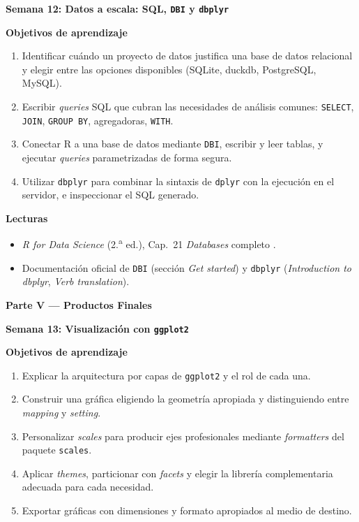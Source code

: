 \documentclass[11pt,letterpaper]{article}
\newcommand{\parteCurso}[1]{%
  \clearpage%
  \vspace*{0.5cm}%
  {\centering\color{main}\fontsize{26pt}{32pt}\selectfont\bfseries #1\par}%
  \vspace{0.8cm}%
}
\newcommand{\semana}[2]{%
  \bigskip%
  {\color{main}\Large\bfseries Semana #1: #2\par}%
  \smallskip%
}
\begin{document}
\semana{12}{Datos a escala: SQL, \texttt{DBI} y \texttt{dbplyr}}

\medskip
\noindent\textbf{Objetivos de aprendizaje}
\begin{enumerate}[leftmargin=*, itemsep=1pt]
    \item Identificar cuándo un proyecto de datos justifica una base de datos relacional y elegir entre las opciones disponibles (SQLite, duckdb, PostgreSQL, MySQL).
    \item Escribir \textit{queries} SQL que cubran las necesidades de análisis comunes: \texttt{SELECT}, \texttt{JOIN}, \texttt{GROUP BY}, agregadoras, \texttt{WITH}.
    \item Conectar R a una base de datos mediante \texttt{DBI}, escribir y leer tablas, y ejecutar \textit{queries} parametrizadas de forma segura.
    \item Utilizar \texttt{dbplyr} para combinar la sintaxis de \texttt{dplyr} con la ejecución en el servidor, e inspeccionar el SQL generado.
\end{enumerate}

\medskip
\noindent\textbf{Lecturas}
\begin{itemize}[leftmargin=*, itemsep=1pt]
    \item \textit{R for Data Science} (2.\textsuperscript{a} ed.), Cap.\ 21 \textit{Databases} completo \cite{wickham2023r4ds}.
    \item Documentación oficial de \texttt{DBI} (sección \textit{Get started}) y \texttt{dbplyr} (\textit{Introduction to dbplyr}, \textit{Verb translation}).
\end{itemize}

\parteCurso{Parte V --- Productos Finales}

\semana{13}{Visualización con \texttt{ggplot2}}

\medskip
\noindent\textbf{Objetivos de aprendizaje}
\begin{enumerate}[leftmargin=*, itemsep=1pt]
    \item Explicar la arquitectura por capas de \texttt{ggplot2} y el rol de cada una.
    \item Construir una gráfica eligiendo la geometría apropiada y distinguiendo entre \textit{mapping} y \textit{setting}.
    \item Personalizar \textit{scales} para producir ejes profesionales mediante \textit{formatters} del paquete \texttt{scales}.
    \item Aplicar \textit{themes}, particionar con \textit{facets} y elegir la librería complementaria adecuada para cada necesidad.
    \item Exportar gráficas con dimensiones y formato apropiados al medio de destino.
\end{enumerate}
\end{document}
